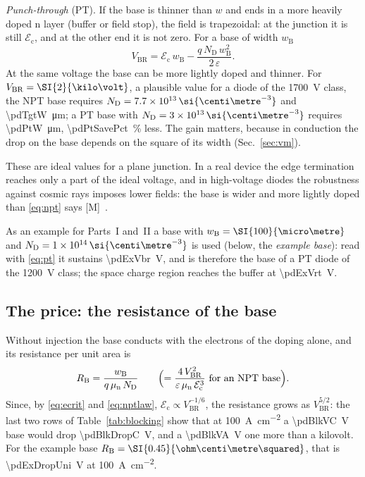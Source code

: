\documentclass[10pt,a4paper]{scrartcl}
\newcommand{\Ec}{\mathcal{E}_\mathrm{c}}      %
\newcommand{\ND}{N_\mathrm{D}}
\newcommand{\wB}{w_\mathrm{B}}
\newcommand{\mun}{\mu_\mathrm{n}}
\newcommand{\Vbr}{V_\mathrm{BR}}
\newcommand{\cmc}{\si{\centi\metre^{-3}}}
\begin{document}
\emph{Punch-through} (PT). If the base is thinner than $w$ and ends in a more heavily doped n layer (buffer or field stop), the field is trapezoidal: at the junction it is still $\Ec$, and at the other end it is not zero. For a base of width $\wB$
\begin{equation}
\Vbr = \Ec\,\wB - \frac{q\,\ND\,\wB^2}{2\,\varepsilon} .
\label{eq:pt}
\end{equation}
At the same voltage the base can be more lightly doped and thinner. For $\Vbr = \SI{\pdTgtV}{\kilo\volt}$, a plausible value for a diode of the \SI{1700}{\volt} class, the NPT base requires $\ND = \pdTgtNd\,\cmc$ and \SI{\pdTgtW}{\micro\metre}; a PT base with $\ND = \pdPtNd\,\cmc$ requires \SI{\pdPtW}{\micro\metre}, \SI{\pdPtSavePct}{\percent} less. The gain matters, because in conduction the drop on the base depends on the square of its width (Sec.~\ref{sec:vm}).

These are ideal values for a plane junction. In a real device the edge termination reaches only a part of the ideal voltage, and in high-voltage diodes the robustness against cosmic rays imposes lower fields: the base is wider and more lightly doped than \eqref{eq:npt} says [M]~\cite{lutz}.

As an example for Parts~I and~II a base with $\wB = \SI{\pdExW}{\micro\metre}$ and $\ND = \pdExNd\,\cmc$ is used (below, the \emph{example base}): read with \eqref{eq:pt} it sustains \SI{\pdExVbr}{\volt}, and is therefore the base of a PT diode of the \SI{1200}{\volt} class; the space charge region reaches the buffer at \SI{\pdExVrt}{\volt}.

\subsection{The price: the resistance of the base}
\label{sec:unipolar}
Without injection the base conducts with the electrons of the doping alone, and its resistance per unit area is
\begin{equation}
R_\mathrm{B} = \frac{\wB}{q\,\mun\,\ND} \qquad \Bigl(= \frac{4\,\Vbr^2}{\varepsilon\,\mun\,\Ec^3} \ \text{for an NPT base}\Bigr) .
\label{eq:runi}
\end{equation}
Since, by \eqref{eq:ecrit} and \eqref{eq:nptlaw}, $\Ec \propto \Vbr^{-1/6}$, the resistance grows as $\Vbr^{5/2}$: the last two rows of Table~\ref{tab:blocking} show that at \SI{100}{\ampere\per\centi\metre\squared} a \SI{\pdBlkVC}{\volt} base would drop \SI{\pdBlkDropC}{\volt}, and a \SI{\pdBlkVA}{\volt} one more than a kilovolt. For the example base $R_\mathrm{B} = \SI{\pdExRuni}{\ohm\centi\metre\squared}$, that is \SI{\pdExDropUni}{\volt} at \SI{100}{\ampere\per\centi\metre\squared}.
\end{document}
